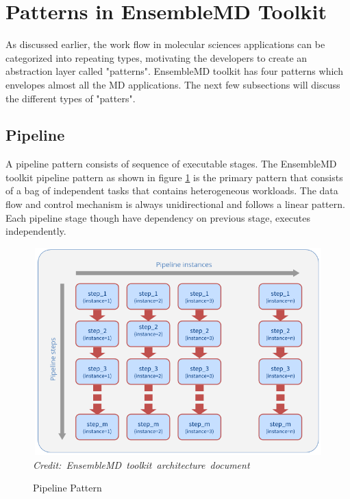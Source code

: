 \documentclass[10pt]{ruthesis}
\begin{document}

\section{Patterns in EnsembleMD Toolkit}
As discussed earlier, the work flow in molecular sciences applications can be categorized into repeating types, motivating the developers to create an abstraction layer called "patterns". EnsembleMD toolkit has four patterns which envelopes almost all the MD applications. The next few subsections will discuss the different types of "patters".

\subsection{Pipeline}
A pipeline pattern consists of sequence of executable stages. The EnsembleMD toolkit pipeline pattern as shown in figure \ref{fig:pipeline} \cite{site1} is the primary pattern that consists of a bag of independent tasks that contains heterogeneous workloads. The data flow and control mechanism is always unidirectional and follows a linear pattern. Each pipeline stage though have dependency on previous stage, executes independently. 
\begin{figure}
  \centering
  \includegraphics[width=12cm,height=8cm]{pipeline_pattern.png}
  \hbox{\small\itshape Credit: EnsembleMD toolkit architecture document \cite{site1}}
  \caption{Pipeline Pattern}
  \label{fig:pipeline}
\end{figure}
\end{document}
